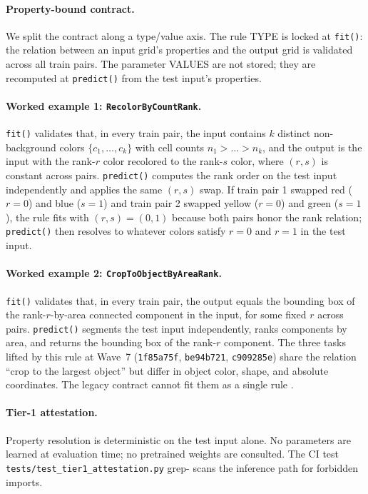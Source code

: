 \documentclass[11pt]{article}
\begin{document}
\paragraph{Property-bound contract.}
We split the contract along a type/value axis. The rule TYPE is locked at
\texttt{fit()}: the relation between an input grid's properties and the
output grid is validated across all train pairs. The parameter VALUES are
not stored; they are recomputed at \texttt{predict()} from the test
input's properties.

\paragraph{Worked example 1: \texttt{RecolorByCountRank}.}
\texttt{fit()} validates that, in every train pair, the input contains
$k$ distinct non-background colors $\{c_1, \dots, c_k\}$ with cell counts
$n_1 > \dots > n_k$, and the output is the input with the rank-$r$ color
recolored to the rank-$s$ color, where $(r, s)$ is constant across pairs.
\texttt{predict()} computes the rank order on the test input
independently and applies the same $(r, s)$ swap. If train pair 1 swapped
red ($r=0$) and blue ($s=1$) and train pair 2 swapped yellow ($r=0$) and
green ($s=1$), the rule fits with $(r, s) = (0, 1)$ because both pairs
honor the rank relation; \texttt{predict()} then resolves to whatever
colors satisfy $r=0$ and $r=1$ in the test input.

\paragraph{Worked example 2: \texttt{CropToObjectByAreaRank}.}
\texttt{fit()} validates that, in every train pair, the output equals
the bounding box of the rank-$r$-by-area connected component in the
input, for some fixed $r$ across pairs. \texttt{predict()} segments the
test input independently, ranks components by area, and returns the
bounding box of the rank-$r$ component. The three tasks lifted by this
rule at Wave~7 (\texttt{1f85a75f}, \texttt{be94b721}, \texttt{c909285e})
share the relation ``crop to the largest object'' but differ in object
color, shape, and absolute coordinates. The legacy contract cannot fit
them as a single rule \cite{wave7receipt}.

\paragraph{Tier-1 attestation.}
Property resolution is deterministic on the test input alone. No
parameters are learned at evaluation time; no pretrained weights are
consulted. The CI test \texttt{tests/test\_tier1\_attestation.py} grep-
scans the inference path for forbidden imports.
\end{document}
